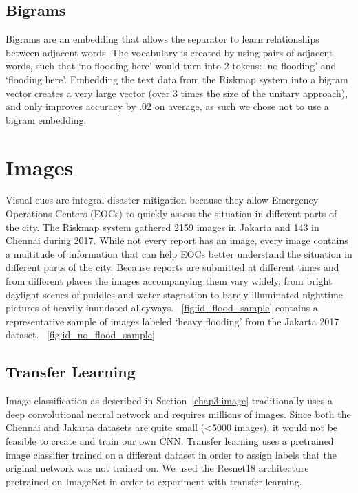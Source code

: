 \subsection{Bigrams}
Bigrams are an embedding that allows the separator to learn relationships
between adjacent words. The vocabulary is created by using pairs of adjacent
words, such that `no flooding here' would turn into 2 tokens: `no flooding' and
`flooding here'. Embedding the text data from the Riskmap system into a bigram
vector creates a very large vector (over 3 times the size of the unitary approach),
and only improves accuracy by .02 on average, as such we chose not to use a
bigram embedding.


\section{Images}
Visual cues are integral disaster mitigation because they allow Emergency
Operations Centers (EOCs) to quickly assess the situation in different parts of
the city. The Riskmap system gathered 2159 images in Jakarta and 143 in Chennai
during 2017. While not every report has an image, every image contains a
multitude of information that can help EOCs better understand the situation in
different parts of the city. Because reports are submitted at different times and
from different places the images accompanying them vary widely, from bright
daylight scenes of puddles and water stagnation to barely illuminated nighttime
pictures of heavily inundated alleyways.
\appendixautorefname{}~\ref{fig:id_flood_sample} contains a representative
sample of images labeled `heavy flooding' from the Jakarta 2017 dataset.
\appendixautorefname{}~\ref{fig:id_no_flood_sample}

\subsection{Transfer Learning}
Image classification as described in Section~\ref{chap3:image} traditionally uses a
deep convolutional neural network and requires millions of images. Since both the
Chennai and Jakarta datasets are quite small (<5000 images), it would not be
feasible to create and train our own CNN. Transfer learning uses a pretrained
image classifier trained on a different dataset in order to assign labels that the
original network was not trained on.
We used the Resnet18 architecture pretrained on ImageNet in order to
experiment with transfer learning.


